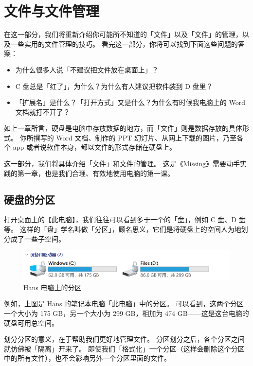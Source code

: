 \chapter{文件与文件管理}

\begin{intro}
  在这一部分，我们将重新介绍你可能所不知道的「文件」以及「文件」的管理，以及一些实用的文件管理的技巧。
  看完这一部分，你将可以找到下面这些问题的答案：
  \begin{itemize}
    \item 为什么很多人说「不建议把文件放在桌面上」？
    \item C 盘总是「红了」，为什么？为什么有人建议把软件装到 D 盘里？
    \item 「扩展名」是什么？「打开方式」又是什么？为什么有时候我电脑上的 Word 文档就打不开了？
  \end{itemize}
\end{intro}

如上一章所言，硬盘是电脑中存放数据的地方，而「文件」则是数据存放的具体形式。
你所撰写的 Word 文档、制作的 PPT 幻灯片、从网上下载的图片，乃至各个 app 或者说软件本身，都以文件的形式存储在硬盘上。

这一部分，我们将具体介绍「文件」和文件的管理。
这是《Missing》需要动手实践的第一章，也是我们合理、有效地使用电脑的第一课。

\section{硬盘的分区}

打开桌面上的【此电脑】，我们往往可以看到多于一个的「盘」，例如 C 盘、D 盘等。
这样的「盘」学名叫做「分区」，顾名思义，它们是将硬盘上的空间人为地划分成了一些子空间。

\begin{figure}[htb!]
  \centering
  \includegraphics[width=13cm]{assets/Hans_Disks.png}
  \caption{Hans 电脑上的分区}
  \label{Hans_Disks}
\end{figure}

例如，上图是 Hans 的笔记本电脑「此电脑」中的分区。
可以看到，这两个分区一个大小为 175 GB，另一个大小为 299 GB，相加为 474 GB——这是这台电脑的硬盘可用总空间。

划分分区的意义，在于帮助我们更好地管理文件。
分区划分之后，各个分区之间就仿佛被「隔离」开来了。
即使我们「格式化」一个分区（这样会删除这个分区中的所有文件），也不会影响另外一个分区里面的文件。

